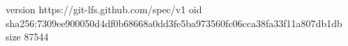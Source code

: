 version https://git-lfs.github.com/spec/v1
oid sha256:7309ee900050d4df0b68668a0dd3fe5ba973560fc06cca38fa33f11a807db1db
size 87544
